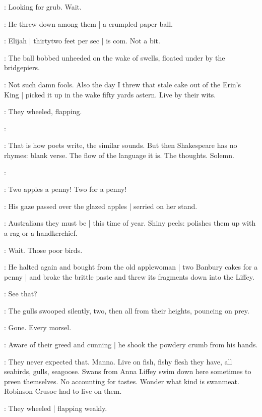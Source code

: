 \BloomInt:
Looking for grub.
Wait.

:
He threw down among them |
a crumpled paper ball.

\BloomInt:
Elijah |
thirtytwo feet per sec |
is com.
Not a bit.

:
The ball bobbed unheeded on the wake of swells,
floated under by the bridgepiers.

\BloomInt:
Not such damn fools.
Also the day I threw that stale cake out of the Erin's King |
picked it up in the wake fifty yards astern.
Live by their wits.

:
They wheeled,
flapping.

\BloomInt:

\BloomInt:
That is how poets write, the similar sounds.
But then Shakespeare has no rhymes:
blank verse.
The flow of the language it is.
The thoughts.
Solemn.

\BloomInt:

:
Two apples a penny!
Two for a penny!

:
His gaze passed over the glazed apples |
serried on her stand.

\BloomInt:
Australians they must be |
this time of year.
Shiny peels:
polishes them up
with a rag or a handkerchief.

\BloomInt:
Wait.
Those poor birds.

:
He halted again and bought from the old applewoman |
two Banbury cakes for a penny |
and broke the brittle paste
and threw its fragments down into the Liffey.

\BloomInt:
See that?

:
The gulls swooped silently,
two,
then all from their heights,
pouncing on prey.

\BloomInt:
Gone.
Every morsel.

:
Aware of their greed and cunning |
he shook the powdery crumb from his hands.

\BloomInt:
They never expected that.
Manna.
Live on fish,
fishy flesh they have,
all seabirds,
gulls,
seagoose.
Swans from Anna Liffey swim down here sometimes
to preen themselves.
No accounting for tastes.
Wonder what kind is swanmeat.
Robinson Crusoe had to live on them.

:
They wheeled |
flapping weakly.

